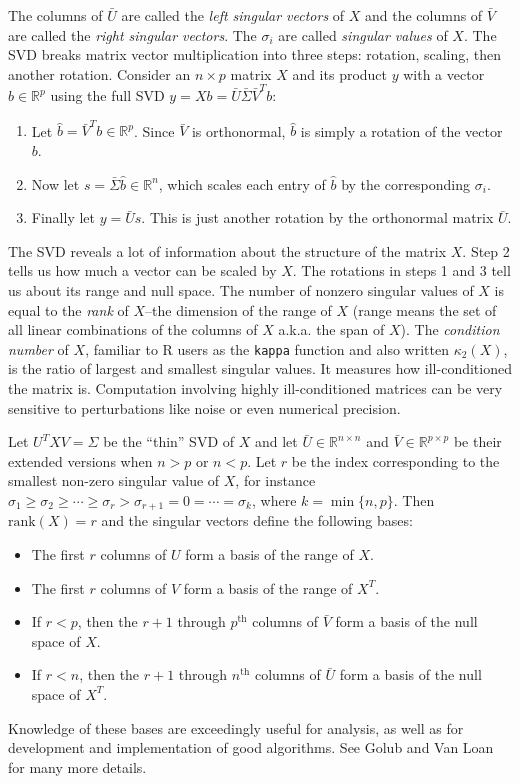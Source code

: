 \documentclass[10pt]{article} %
\newcommand{\R}{{\mathbb R}}
\begin{document}
The columns of $\bar{U}$ are called the {\it left singular vectors} of $X$ and the
columns of $\bar{V}$ are called the {\it right singular vectors}.  The $\sigma_i$ are
called {\it singular values} of $X$.  The SVD breaks matrix vector
multiplication into three steps: rotation, scaling, then another rotation.
Consider an $n\times p$ matrix
$X$ and its product $y$ with a vector $b\in\R^p$ using the
full SVD
$y=Xb = \bar{U}\bar{\Sigma}\bar{V}^Tb$:
\begin{enumerate}
\item Let $\hat{b}=\bar{V}^T b\in\R^p$.
Since $\bar{V}$ is orthonormal, $\hat{b}$ is simply a rotation of the
vector $b$.
\item Now let $s = \bar{\Sigma}\hat{b}\in\R^n$,
which scales each entry of $\hat{b}$ by the corresponding $\sigma_i$.
\item Finally let $y=\bar{U}s$. This is just another rotation by the
orthonormal matrix $\bar{U}$.
\end{enumerate}
The SVD reveals a lot of information about the structure of the matrix $X$.
Step 2 tells us how much a vector can be scaled by $X$.  The rotations in steps
1 and 3 tell us about its range and null space.  The number of nonzero singular
values of $X$ is equal to the \emph{rank} of $X$--the dimension of the range of
$X$ (range means the set of all linear combinations of the columns of $X$
a.k.a.  the span of $X$).  The {\it condition number}
of $X$, familiar to R users as the \verb+kappa+ function and also written
$\kappa_2(X)$, is the ratio of largest and smallest singular values.  It
measures how ill-conditioned the matrix is. Computation involving highly
ill-conditioned matrices can be very sensitive to perturbations like noise or
even numerical precision.

Let $U^TXV=\Sigma$ be the ``thin'' SVD of $X$ and let
$\bar{U}\in\R^{n\times n}$ and $\bar{V}\in\R^{p\times p}$ be
their extended versions when $n > p$ or $n < p$.  Let $r$ be the index
corresponding to the smallest non-zero singular value of $X$, for instance
$\sigma_1 \ge \sigma_2 \ge \cdots \ge \sigma_r > \sigma_{r+1} = 0 = \cdots = \sigma_k$,
where $k=\min\{n,p\}$. Then $\mbox{rank}(X) = r$ and the singular vectors define the
following bases:
\begin{itemize}
\item The first $r$ columns of $U$ form a basis of the range of $X$.
\item The first $r$ columns of $V$ form a basis of the range of $X^T$.
\item If $r<p$, then the $r+1$ through $p^{\mathrm{th}}$ columns of
$\bar{V}$ form a basis of the null space of $X$.
\item If $r<n$, then the $r+1$ through $n^{\mathrm{th}}$ columns of
$\bar{U}$ form a basis of the null space of $X^T$.
\end{itemize}
Knowledge of these bases are exceedingly useful for analysis, as well as for
development and implementation of good algorithms.
See Golub and Van Loan\cite{gvl} for many more details.
\end{document}
